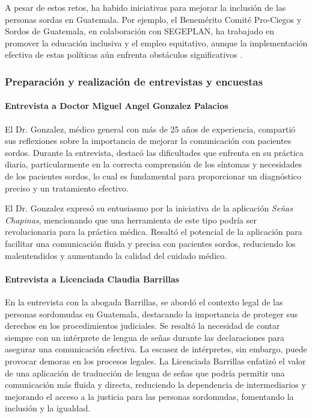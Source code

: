 A pesar de estos retos, ha habido iniciativas para mejorar la inclusión de las personas sordas en Guatemala. Por ejemplo, el Benemérito Comité Pro-Ciegos y Sordos de Guatemala, en colaboración con SEGEPLAN, ha trabajado en promover la educación inclusiva y el empleo equitativo, aunque la implementación efectiva de estas políticas aún enfrenta obstáculos significativos \cite{GobiernoGuatemala2022}.


\subsubsection{Preparación y realización de entrevistas y encuestas}

\paragraph{Entrevista a Doctor Miguel Angel Gonzalez Palacios}

El Dr. Gonzalez, médico general con más de 25 años de experiencia, compartió sus reflexiones sobre la importancia de mejorar la comunicación con pacientes sordos. Durante la entrevista, destacó las dificultades que enfrenta en su práctica diaria, particularmente en la correcta comprensión de los síntomas y necesidades de los pacientes sordos, lo cual es fundamental para proporcionar un diagnóstico preciso y un tratamiento efectivo.

El Dr. Gonzalez expresó su entusiasmo por la iniciativa de la aplicación \textit{Señas Chapinas}, mencionando que una herramienta de este tipo podría ser revolucionaria para la práctica médica. Resaltó el potencial de la aplicación para facilitar una comunicación fluida y precisa con pacientes sordos, reduciendo los malentendidos y aumentando la calidad del cuidado médico. 

\paragraph{Entrevista a Licenciada Claudia Barrillas}

En la entrevista con la abogada Barrillas, se abordó el contexto legal de las personas sordomudas en Guatemala, destacando la importancia de proteger sus derechos en los procedimientos judiciales. Se resaltó la necesidad de contar siempre con un intérprete de lengua de señas durante las declaraciones para asegurar una comunicación efectiva. La escasez de intérpretes, sin embargo, puede provocar demoras en los procesos legales. La Licenciada Barrillas enfatizó el valor de una aplicación de traducción de lengua de señas que podría permitir una comunicación más fluida y directa, reduciendo la dependencia de intermediarios y mejorando el acceso a la justicia para las personas sordomudas, fomentando la inclusión y la igualdad.

